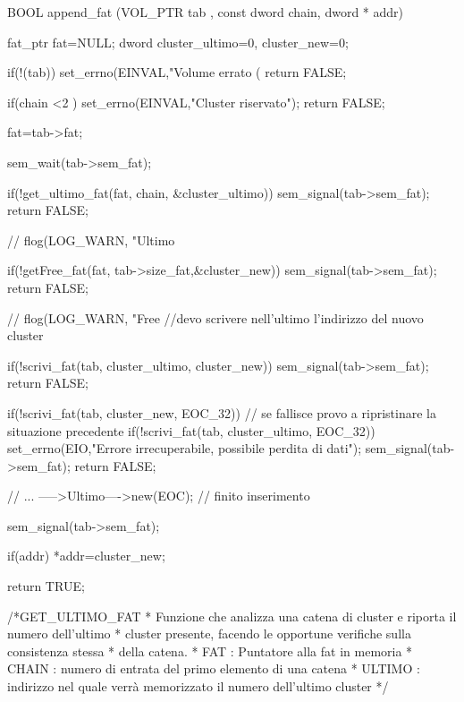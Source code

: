 BOOL append_fat (VOL_PTR tab , const dword chain, dword * addr) {
  
  fat_ptr fat=NULL; 
  dword cluster_ultimo=0, cluster_new=0;
  
  if(!(tab)) {
    set_errno(EINVAL,"Volume errato (%
    return FALSE; 
  }
  
  if(chain <2 ) { 
     set_errno(EINVAL,"Cluster riservato");
    return FALSE; 
  }
  
  fat=tab->fat; 
  
  sem_wait(tab->sem_fat); 
  
    if(!get_ultimo_fat(fat, chain, &cluster_ultimo)) {
      sem_signal(tab->sem_fat); 
      return FALSE; 
    }
    
//    flog(LOG_WARN, "Ultimo %
    
  if(!getFree_fat(fat, tab->size_fat,&cluster_new)) {
     sem_signal(tab->sem_fat);
    return FALSE; 
  }
  
//    flog(LOG_WARN, "Free %
  //devo scrivere nell'ultimo l'indirizzo del nuovo cluster
    
    if(!scrivi_fat(tab, cluster_ultimo, cluster_new))  {
      sem_signal(tab->sem_fat);
      return FALSE; 
    }
    
  if(!scrivi_fat(tab, cluster_new, EOC_32)) {
    // se fallisce provo a ripristinare la situazione precedente
    if(!scrivi_fat(tab, cluster_ultimo,  EOC_32)) 
      set_errno(EIO,"Errore irrecuperabile, possibile perdita di dati");    
      sem_signal(tab->sem_fat); 
     return FALSE; 
    }
  
  // ... ----->Ultimo---->new(EOC); 
  // finito inserimento 

  sem_signal(tab->sem_fat); 
  
  if(addr)
    *addr=cluster_new; 
  
  return TRUE; 
  
}
/*GET_ULTIMO_FAT 
 * Funzione che analizza una catena di cluster e riporta  il numero dell'ultimo 
 * cluster presente, facendo le opportune verifiche sulla consistenza stessa 
 * della catena.
 * FAT : Puntatore alla fat in memoria 
 * CHAIN : numero di entrata del primo elemento di una catena 
 * ULTIMO : indirizzo nel quale verrà memorizzato il numero dell'ultimo cluster
 */

